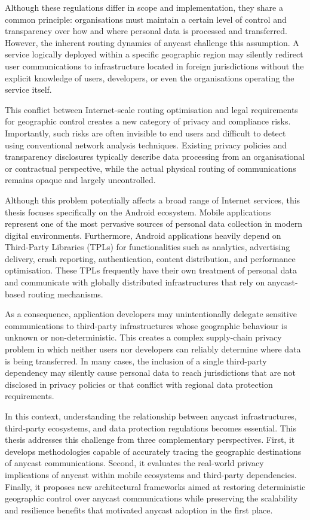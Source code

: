 Although these regulations differ in scope and implementation, they share a common principle: organisations must maintain a certain level of control and transparency over how and where personal data is processed and transferred. However, the inherent routing dynamics of anycast challenge this assumption. A service logically deployed within a specific geographic region may silently redirect user communications to infrastructure located in foreign jurisdictions without the explicit knowledge of users, developers, or even the organisations operating the service itself.

This conflict between Internet-scale routing optimisation and legal requirements for geographic control creates a new category of privacy and compliance risks. Importantly, such risks are often invisible to end users and difficult to detect using conventional network analysis techniques. Existing privacy policies and transparency disclosures typically describe data processing from an organisational or contractual perspective, while the actual physical routing of communications remains opaque and largely uncontrolled.

Although this problem potentially affects a broad range of Internet services, this thesis focuses specifically on the Android ecosystem. Mobile applications represent one of the most pervasive sources of personal data collection in modern digital environments. Furthermore, Android applications heavily depend on Third-Party Libraries (TPLs) for functionalities such as analytics, advertising delivery, crash reporting, authentication, content distribution, and performance optimisation. These TPLs frequently have their own treatment of personal data and communicate with globally distributed infrastructures that rely on anycast-based routing mechanisms.

As a consequence, application developers may unintentionally delegate sensitive communications to third-party infrastructures whose geographic behaviour is unknown or non-deterministic. This creates a complex supply-chain privacy problem in which neither users nor developers can reliably determine where data is being transferred. In many cases, the inclusion of a single third-party dependency may silently cause personal data to reach jurisdictions that are not disclosed in privacy policies or that conflict with regional data protection requirements.

In this context, understanding the relationship between anycast infrastructures, third-party ecosystems, and data protection regulations becomes essential. This thesis addresses this challenge from three complementary perspectives. First, it develops methodologies capable of accurately tracing the geographic destinations of anycast communications. Second, it evaluates the real-world privacy implications of anycast within mobile ecosystems and third-party dependencies. Finally, it proposes new architectural frameworks aimed at restoring deterministic geographic control over anycast communications while preserving the scalability and resilience benefits that motivated anycast adoption in the first place.

